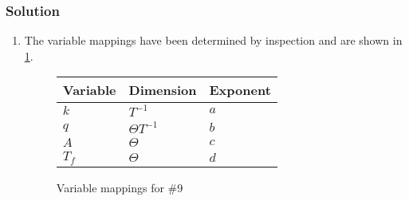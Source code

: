 \documentclass[12pt,twoside]{article}
\begin{document}
\subsubsection*{Solution}
\begin{enumerate}
\item The variable mappings have been determined by inspection and are shown in
  \cref{fig:9-var-mappings}.

  \begin{figure}
    \centering
    \begin{tabularx}{0.5\textwidth}{XXX}
      Variable & Dimension & Exponent \\ \hline
      $k$ & $T^{-1}$ & $a$ \\
      $q$ & $\Theta T^{-1}$ & $b$ \\
      $A$ & $\Theta$ & $c$ \\
      $T_f$ & $\Theta$ & $d$ \\
    \end{tabularx}
    \caption{Variable mappings for \#9}
    \label{fig:9-var-mappings}
  \end{figure}


\end{enumerate}
\end{document}
